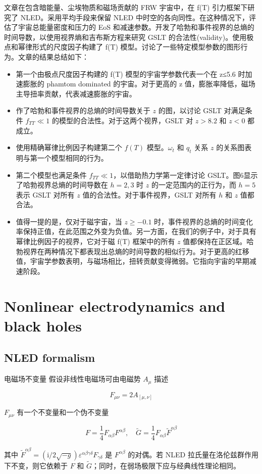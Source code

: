 \documentclass[9pt, dvipsnames]{beamer} %
\begin{document}
\begin{frame}
    文章在包含暗能量、尘埃物质和磁场贡献的 FRW 宇宙中，在 f(T) 引力框架下研究了 NLED。采用平均手段来保留 NLED 中时空的各向同性。在这种情况下，评估了宇宙总能量密度和压力的 EoS 和减速参数。开发了哈勃和事件视界的总熵的时间导数，以使用视界熵和吉布斯方程来研究 GSLT 的合法性(validity)。使用极点和幂律形式的尺度因子构建了 f(T) 模型。讨论了一些特定模型参数的图形行为。文章的结果总结如下：


    \begin{itemize}
        \item 第一个由极点尺度因子构建的 f(T) 模型的宇宙学参数代表一个在 z≤5.6 时加速膨胀的 phamtom dominated 的宇宙。对于更高的 z 值，膨胀率降低，磁场主导扭率贡献，代表减速膨胀的宇宙。
        \item 作了哈勃和事件视界的总熵的时间导数关于 $z$ 的图，以讨论 GSLT 对满足条件 $f_{TT} \ll 1 $  的模型的合法性。对于这两个视界，GSLT 对 $z >8.2$ 和 $z <0$ 都成立。
        \item 使用精确幂律比例因子构建第二个 $f(T)$ 模型。$\omega_t$ 和 $q_t$ 关系 $z$ 的关系图表明与第一个模型相同的行为。
        \item 第二个模型也满足条件 $f_{TT}\ll 1$，以借助热力学第一定律讨论 GSLT。图6显示了哈勃视界总熵的时间导数在 $h = 2,3$ 时 $z$ 的一定范围内的正行为，而 $h = 5$ 表示 GSLT 对所有 $z$ 值的合法性。对于事件视界，GSLT 对所有 $h$ 和 $z$ 值都合法。
        \item 值得一提的是，仅对于磁宇宙，当 $z \geqslant -0.1$ 时，事件视界的总熵的时间变化率保持正值，在此范围之外变为负值。另一方面，在我们的例子中，对于具有幂律比例因子的视界，它对于磁 f(T) 框架中的所有 $z$ 值都保持在正区域。哈勃视界在两种情况下都表现出总熵的时间导数的相似行为。对于更高的红移值，宇宙学参数表明，与磁场相比，扭转贡献变得微弱。它指向宇宙的早期减速阶段。
    \end{itemize}
\end{frame}

\section{Nonlinear electrodynamics and black holes}

\subsection{NLED formalism}

\begin{frame}{电磁场不变量}
    假设非线性电磁场可由电磁势 $A_\mu$ 描述

    $$
    F_{\mu\nu}
    =2A_{[\mu,\nu]}
    $$

    $F_{\mu\nu}$ 有一个不变量和一个伪不变量

    $$
    F = \frac{1 }{4 } F_{\alpha\beta}F^{\alpha\beta},\quad
    \tilde{G} = \frac{1 }{4 } F_{\alpha\beta} \tilde{F}^{\alpha\beta} 
    $$

    其中 $\tilde{F}^{\alpha\beta}=\left(\mathrm{i}/2\sqrt{-g} \right)\varepsilon^{\alpha\beta\gamma\delta}F_{\gamma\delta}$ 是 $F^{\alpha\beta}$ 的对偶。若 NLED 拉氏量在洛伦兹群作用下不变，则它依赖于 $F$ 和 $\tilde{G}$；同时，在弱场极限下应与经典线性理论相同。
\end{frame}
\end{document}

